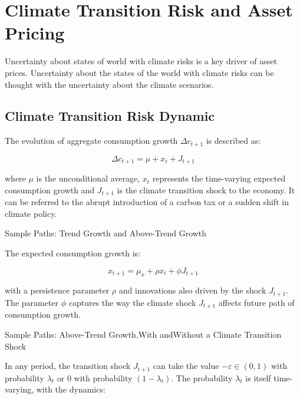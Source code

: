 \chapter{Climate Transition Risk and Asset Pricing}

Uncertainty about states of world with climate risks 
is a key driver of asset prices. Uncertainty
about the states of the world with climate risks
can be thought with the uncertainty about the 
climate scenarios.


\section{Climate Transition Risk Dynamic}

The evolution of aggregate consumption growth $\Delta c_{t+1}$
is described as:

\begin{equation}
\Delta c_{t+1} = \mu + x_t + J_{t+1}
\end{equation}

where $\mu$ is the unconditional average, $x_t$ represents the
time-varying expected consumption growth and 
$J_{t+1}$ is the climate transition shock to the economy.
It can be referred to the abrupt introduction of 
a carbon tax or a sudden shift in climate policy.


\begin{tcolorbox}[colback=white, colframe=black, title=Example X]
    Sample Paths: Trend Growth and Above-Trend Growth
\end{tcolorbox}

The expected consumption growth is:

\begin{equation}
    x_{t+1} = \mu_x + \rho x_t + \phi J_{t+1}
\end{equation}

with a persistence parameter $\rho$ and innovations also driven 
by the shock $J_{t+1}$. The parameter $\phi$ captures the way 
the climate shock $J_{t+1}$ affects future path of consumption
growth.

\begin{tcolorbox}[colback=white, colframe=black, title=Example X]
    Sample Paths: Above-Trend Growth,With andWithout a Climate 
    Transition Shock
\end{tcolorbox}

In any period, the transition shock $J_{t+1}$ can take the value 
$-\varepsilon \in (0,1)$ with probability $\lambda_t$ or $0$ with 
probability $(1 - \lambda_t)$. The probability $\lambda_t$ is
itself time-varying, with the dynamics:

